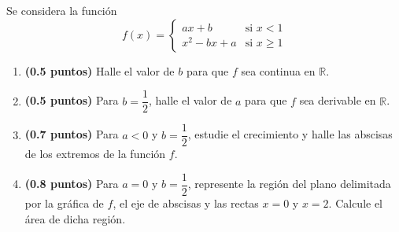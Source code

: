 
Se considera la función
\[
f(x)=\begin{cases}
ax+b & \text{si }x<1\\
x^2-bx+a & \text{si }x\geq 1
\end{cases}
\]
\begin{enumerate}[label=\alph*)]
  \item \textbf{(0.5 puntos)} Halle el valor de $b$ para que $f$ sea continua
  en $\mathbb{R}$.
  \item \textbf{(0.5 puntos)} Para $b=\dfrac{1}{2}$, halle el valor de $a$
  para que $f$ sea derivable en $\mathbb{R}$.
  \item \textbf{(0.7 puntos)} Para $a<0$ y $b=\dfrac{1}{2}$, estudie el
  crecimiento y halle las abscisas de los extremos de la función $f$.
  \item \textbf{(0.8 puntos)} Para $a=0$ y $b=\dfrac{1}{2}$, represente
  la región del plano delimitada por la gráfica de $f$, el eje de abscisas
  y las rectas $x=0$ y $x=2$. Calcule el área de dicha región.
\end{enumerate}
